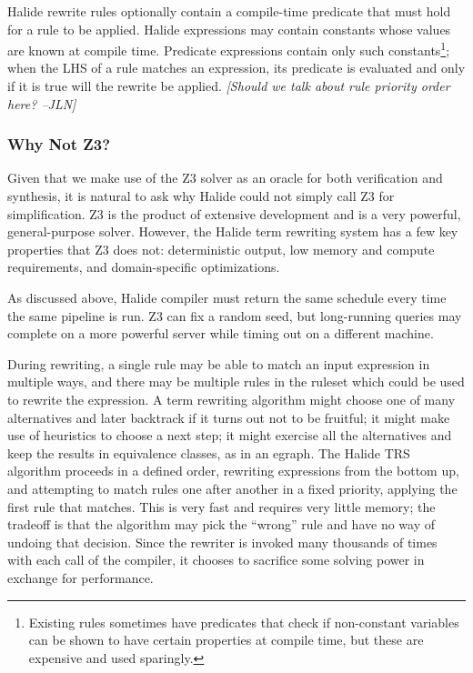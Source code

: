 \documentclass[acmsmall,review]{acmart}\settopmatter{printfolios=true,printccs=false,printacmref=false}
\newcommand{\jln}[1]{\textcolor{uwpurple}{\textit{[{#1} --JLN]}}}
\begin{document}
Halide rewrite rules optionally contain a compile-time predicate that must hold for a rule to
be applied. Halide expressions may contain constants whose values are known at
compile time. Predicate expressions contain only such
constants\footnote{Existing rules sometimes have predicates that check if
  non-constant variables can be shown to have certain properties at compile
  time, but these are expensive and used sparingly.}; when the LHS of a rule
matches an expression, its predicate is evaluated and only if it
is true will the rewrite be applied.
\jln{Should we talk about rule priority order here?}

\subsubsection{Why Not Z3?}

Given that we make use of the Z3 solver as an oracle for both verification and synthesis, it is natural to ask why Halide could not simply call Z3 for simplification. Z3 is the product of extensive development and is a very powerful, general-purpose solver. However, the Halide term rewriting system has a few key properties that Z3 does not: deterministic output, low memory and compute requirements, and domain-specific optimizations.

As discussed above, Halide compiler must return the same schedule every time the same pipeline is run. Z3 can fix a random seed, but long-running queries may complete on a more powerful server while timing out on a different machine.

During rewriting, a single rule may be able to match an input expression in multiple ways, and there may be multiple rules in the ruleset which could be used to rewrite the expression. A term rewriting algorithm might choose one of many alternatives and later backtrack if it turns out not to be fruitful; it might make use of heuristics to choose a next step; it might exercise all the alternatives and keep the results in equivalence classes, as in an egraph. The Halide TRS algorithm proceeds in a defined order, rewriting expressions from the bottom up, and attempting to match rules one after another in a fixed priority, applying the first rule that matches. This is very fast and requires very little memory; the tradeoff is that the algorithm may pick the ``wrong'' rule and have no way of undoing that decision. Since the rewriter is invoked many thousands of times with each call of the compiler, it chooses to sacrifice some solving power in exchange for performance.
\end{document}
